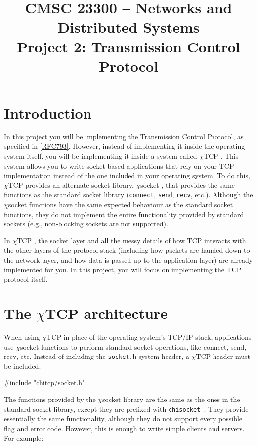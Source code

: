 \documentclass[10pt]{article}
\title{CMSC 23300 -- Networks and Distributed Systems\\{\large Project 2: Transmission Control Protocol}}
\date{}
\newcommand{\chitcp}{$\chi$\textsf{TCP} }
\newcommand{\chisocket}{$\chi$\textsf{socket} }
\newcommand{\RFC}[1]{\href{http://tools.ietf.org/html/rfc#1}{[RFC#1]}}
\newenvironment{example}%
{\VerbatimEnvironment\begin{Sbox}\begin{VerbExample}}%
{\end{VerbExample}\end{Sbox}\setlength{\fboxsep}{8pt}\begin{center}\fcolorbox{black}{backgroundgray}{\TheSbox}\end{center}}
\begin{document}
\pagestyle{empty}
\maketitle

\section{Introduction}

In this project you will be implementing the Transmission Control Protocol, as specified in \RFC{793}. However, instead of implementing it inside the operating system itself, you will be implementing it inside a system called \chitcp. This system allows you to write socket-based applications that rely on your TCP implementation instead of the one included in your operating system. To do this, \chitcp provides an alternate socket library, \chisocket, that provides the same functions as the standard socket library (\texttt{connect}, \texttt{send}, \texttt{recv}, etc.). Although the \chisocket functions have the same expected behaviour as the standard socket functions, they do not implement the entire functionality provided by standard sockets (e.g., non-blocking sockets are not supported).

In \chitcp, the socket layer and all the messy details of how TCP interacts with the other layers of the protocol stack (including how packets are handed down to the network layer, and how data is passed up to the application layer) are already implemented for you. In this project, you will focus on implementing the TCP protocol itself.



\section{The \chitcp architecture}
\label{sec:arch}

When using \chitcp in place of the operating system's TCP/IP stack, applications use \chisocket functions to perform standard socket operations, like connect, send, recv, etc. Instead of including the \texttt{socket.h} system header, a \chitcp header must be included:

\begin{example}
#include "chitcp/socket.h"
\end{example}

The functions provided by the \chisocket library are the same as the ones in the standard socket library, except they are prefixed with \texttt{chisocket\_}. They provide essentially the same functionality, although they do not support every possible flag and error code. However, this is enough to write simple clients and servers. For example:
\end{document}
